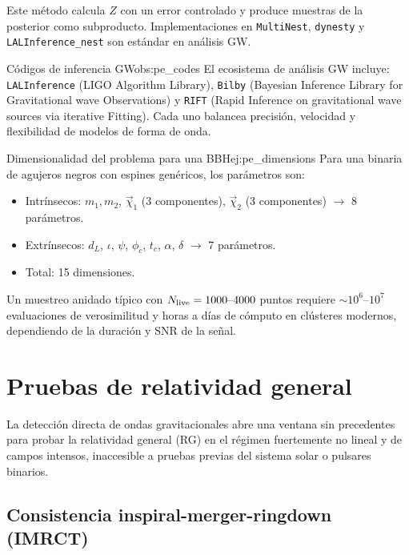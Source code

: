 Este método calcula $Z$ con un error controlado y produce muestras de la posterior como subproducto. Implementaciones en \texttt{MultiNest}, \texttt{dynesty} y \texttt{LALInference\_nest} son estándar en análisis GW.

\begin{observacion}{Códigos de inferencia GW}{obs:pe_codes}
El ecosistema de análisis GW incluye: \texttt{LALInference} (LIGO Algorithm Library), \texttt{Bilby} (Bayesian Inference Library for Gravitational wave Observations) y \texttt{RIFT} (Rapid Inference on gravitational wave sources via iterative Fitting). Cada uno balancea precisión, velocidad y flexibilidad de modelos de forma de onda.
\end{observacion}

\begin{ejemplo}{Dimensionalidad del problema para una BBH}{ej:pe_dimensions}
Para una binaria de agujeros negros con espines genéricos, los parámetros son:
\begin{itemize}[leftmargin=2em]
  \item Intrínsecos: $m_1, m_2$, $\vec\chi_1$ (3 componentes), $\vec\chi_2$ (3 componentes) $\to$ 8 parámetros.
  \item Extrínsecos: $d_L$, $\iota$, $\psi$, $\phi_c$, $t_c$, $\alpha$, $\delta$ $\to$ 7 parámetros.
  \item Total: 15 dimensiones.
\end{itemize}
Un muestreo anidado típico con $N_{\rm live}=1000\text{--}4000$ puntos requiere $\sim 10^6\text{--}10^7$ evaluaciones de verosimilitud y horas a días de cómputo en clústeres modernos, dependiendo de la duración y SNR de la señal.
\end{ejemplo}

\section{Pruebas de relatividad general}
\label{sec:tests_gr}

La detección directa de ondas gravitacionales abre una ventana sin precedentes para probar la relatividad general (RG) en el régimen fuertemente no lineal y de campos intensos, inaccesible a pruebas previas del sistema solar o pulsares binarios.

\subsection{Consistencia inspiral-merger-ringdown (IMRCT)}

